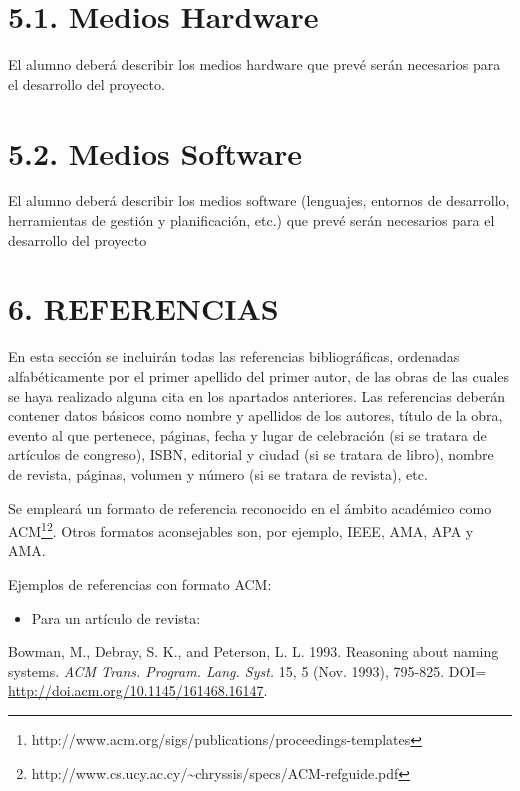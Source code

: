 \documentclass[a4paper]{article}
\newcommand\liststyleLi{%
\renewcommand\labelitemi{{\textbullet}}
\renewcommand\labelitemii{${\circ}$}%
\renewcommand\labelitemiii{${\blacksquare}$}
\renewcommand\labelitemiv{{\textbullet}}
}
\begin{document}
\section{5.1. Medios Hardware}

El alumno deber\'a describir los medios hardware que prev\'e ser\'an necesarios para el desarrollo del proyecto.

\section{5.2. Medios Software}

El alumno deber\'a describir los medios software (lenguajes, entornos de desarrollo, herramientas de gesti\'on y
planificaci\'on, etc.) que prev\'e ser\'an necesarios para el desarrollo del proyecto


\section[6. REFERENCIAS]{6. REFERENCIAS}
En esta secci\'on se incluir\'an todas las referencias bibliogr\'aficas, ordenadas alfab\'eticamente por el primer
apellido del primer autor, de las obras de las cuales se haya realizado alguna cita en los apartados anteriores. Las
referencias deber\'an contener datos b\'asicos como nombre y apellidos de los autores, t\'itulo de la obra, evento al
que pertenece, p\'aginas, fecha y lugar de celebraci\'on (si se tratara de art\'iculos de congreso), ISBN, editorial y
ciudad (si se tratara de libro), nombre de revista, p\'aginas, volumen y n\'umero (si se tratara de revista), etc.

Se emplear\'a un formato de referencia reconocido en el \'ambito acad\'emico como
ACM\footnote{http://www.acm.org/sigs/publications/proceedings-templates}\footnote{http://www.cs.ucy.ac.cy/\~{}chryssis/specs/ACM-refguide.pdf}.
Otros formatos aconsejables son, por ejemplo, IEEE, AMA, APA y AMA.

Ejemplos de referencias con formato ACM:

\liststyleLi
\begin{itemize}
\item Para un art\'iculo de revista:
\end{itemize}
Bowman, M., Debray, S. K., and Peterson, L. L. 1993. Reasoning about naming systems. \textit{ACM Trans. Program. Lang.
Syst.} 15, 5 (Nov. 1993), 795-825. DOI= \url{http://doi.acm.org/10.1145/161468.16147}.
\end{document}
